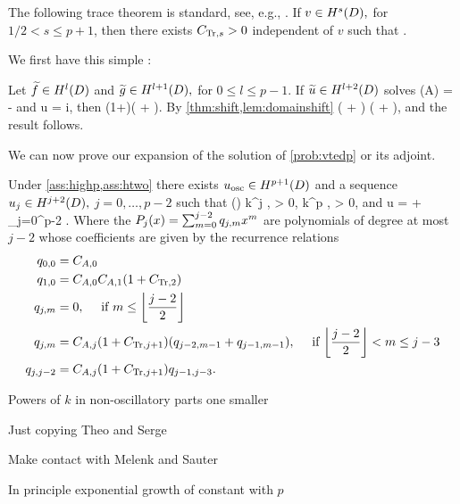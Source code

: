 The following trace theorem is standard, see, e.g., \cite[Theorem 3.37]{Mc:00}.
\label{thm:trace}
If $v \in \HsD,$ for $1/2 < s \leq p+1$, then there exists $C_{\mathrm{Tr},s} > 0$ independent of $v$ such that
\beqs
{} \leq \CTrs {}.
\eeqs
\enth

We first have this simple :

\ble\label{lem:domainshift}
Let $\ftilde \in \HlD$ and $\gtilde \in \HlpoD,$ for $0 \leq l \leq p-1$. If $\utilde \in \HlptD$ solves
\beqs
\grad \cdot \mleft(A\grad \utilde\mright) = -\ftilde
\eeqs
and
\beqs
\dn u = i\gtilde,
\eeqs
then
\beqs
\NHlptD{\utilde} \leq \CAl\mleft(1+\CTrlpo\mright)\mleft(\NHlD{\ftilde} + \NHlpoD{\gtilde}\mright).
\eeqs
\ele
{}
By \cref{thm:shift,lem:domainshift}
\beqs
\NHlptD{\utilde} \leq \CAl \mleft(\NHlD{\ftilde} + \NHlphGI{\gtilde}\mright) \leq \CAl \mleft(\NHlD{\ftilde} + \CTrs\NHlpoD{\gtilde}\mright),
\eeqs
and the result follows.
\epf

We can now prove our expansion of the solution of \cref{prob:vtedp} or its adjoint.

\label{thm:expansion}
Under \cref{ass:highp,ass:htwo} there exists $\uosc \in \HppoD$ and a sequence $\usj \in \HjptD,$ $j = 0,\ldots,p-2$ such that
\beq\label{eq:expansionuj}
\NHjptD{\usj} \leq \Pj() k^j , \Cj > 0,
\eeq
\beq\label{eq:expansionuosc}
\NHppoD{\uosc} \leq \Cosc k^p ,  \Cosc > 0,
\eeq
and
\beq\label{eq:expansionid}
u = \uosc + \sum_{j=0}^{p-2} \usj.
\eeq
Where the $P_{j}(x) = \sum_{m=0}^{j-2}q_{j,m}x^m $ are polynomials of degree at most $j-2$ whose coefficients are given by the recurrence relations
\begin{align*}
\pfn{0,0}&= \CAz\\
\pfn{1,0}&  = \CAz\CAo\mleft(1+\CTrt\mright)\\
\pfn{j,m}& = 0, \quad\tif m \leq \floor{\frac{j-2}2}\\
\pfn{j,m}& = \CAj\mleft(1+\CTrjpo\mright) \mleft(\pfn{j-2,m-1} + \pfn{j-1,m-1}\mright),\quad\tif \floor{\frac{j-2}2} < m \leq j-3\\
\pfn{j,j-2}& = \CAj\mleft(1+\CTrjpo\mright) \pfn{j-1,j-3}.
\end{align*}
\enth

\bit
\item Powers of $k$ in non-oscillatory parts one smaller
\item Just copying Theo and Serge
\item Make contact with Melenk and Sauter
\item In principle exponential growth of constant with $p$
\eit

